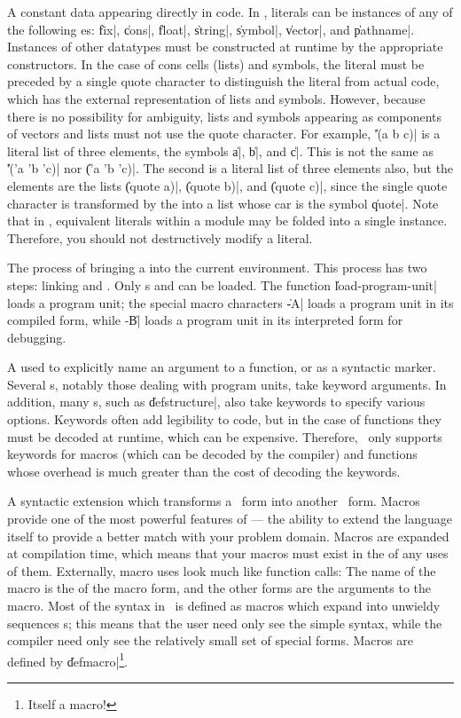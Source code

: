 \begin{description}
	{A constant data appearing directly in code.  In \Talk,
	literals can be instances of any of the following
	es: \|fix|, \|cons|, \|float|, \|string|,
	\|symbol|, \|vector|, and \|pathname|.  Instances of other
	datatypes must be constructed at runtime by the appropriate
	constructors. In the case of cons cells (lists) and symbols,
	the literal must be preceded by a single quote character to
	distinguish the literal from actual code, which has the
	external representation of lists and symbols.  However,
	because there is no possibility for ambiguity, lists and
	symbols appearing as components of vectors and lists must not
	use the quote character.  For example, \|'(a b c)| is a
	literal list of three elements, the symbols \|a|, \|b|, and
	\|c|.  This is not the same as \|'('a 'b 'c)| nor \|('a 'b
	'c)|.  The second is a literal list of three elements also,
	but the elements are the lists \|(quote a)|, \|(quote b)|, and
	\|(quote c)|, since the single quote character is transformed
	by the  into a list whose car is the symbol
	\|quote|.  Note that in \Talk, equivalent literals within a
	module may be folded into a single instance.  Therefore, you
	should not destructively modify a literal.}

	{The process of bringing a  into the
	current environment.  This process has two steps:  linking and
	.  Only s and 
	can be loaded. The function \|load-program-unit| loads a
	program unit; the special macro characters \Hat\|-A| loads a
	program unit in its compiled form, while \Hat-\|B| loads a
	program unit in its interpreted form for debugging.}

	{A  used to explicitly name an argument to a
	function, or as a syntactic marker.  Several s,
	notably those dealing with program units, take keyword
	arguments.  In addition, many s, such as
	\|defstructure|, also take keywords to specify various
	options.  Keywords often add legibility to code, but in the
	case of functions they must be decoded at runtime, which can
	be expensive.  Therefore, \Talk\ only supports keywords for
	macros (which can be decoded by the compiler) and functions
	whose overhead is much greater than the cost of decoding the
	keywords.}

	{A syntactic extension which transforms a \Talk\ form into
	another \Talk\ form.  Macros provide one of the most powerful
	features of \Talk\/ --- the ability to extend the language
	itself to provide a better match with your problem domain.
	Macros are expanded at compilation time, which means that your
	macros must exist in the  of any
	uses of them.  Externally, macro uses look much like function
	calls:  The name of the macro is the  of the macro
	form, and the other forms are the arguments to the macro.
	Most of the syntax in \Talk\ is defined as macros which expand
	into unwieldy sequences s; this means that
	the user need only see the simple syntax, while the compiler
	need only see the relatively small set of special forms.
	Macros are defined by \|defmacro|\footnote{Itself a macro!}.}


\end{description}
